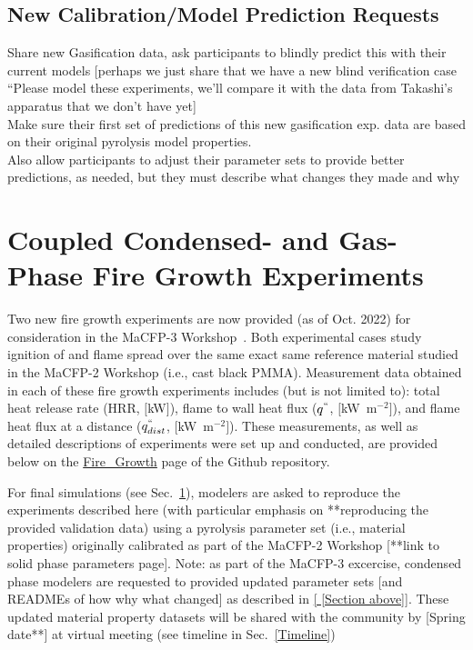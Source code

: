 \documentclass[12pt,demo]{article}
\begin{document}
\subsection{New Calibration/Model Prediction Requests }
Share new Gasification data, ask participants to blindly predict this with their current models [perhaps we just share that we have a new blind verification case “Please model these experiments, we’ll compare it with the data from Takashi’s apparatus that we don’t have yet]\\
Make sure their first set of predictions of this new gasification exp. data are based on their original pyrolysis model properties.\\
Also allow participants to adjust their parameter sets to provide better predictions, as needed, but they must describe what changes they made and why\\

\clearpage
\section{Coupled Condensed- and Gas-Phase Fire Growth Experiments}
Two new fire growth experiments are now provided (as of Oct. 2022) for consideration in the MaCFP-3 Workshop~\cite{chaudhari2021experimental, Leventon2022ParallelPanel}. Both experimental cases study ignition of and flame spread over the same exact same reference material studied in the MaCFP-2 Workshop (i.e., cast black PMMA). Measurement data obtained in each of these fire growth experiments includes (but is not limited to): total heat release rate (HRR, $[$kW$]$), flame to wall heat flux ($q^{``}$, $[$kW~m$^{-2}$$]$), and flame heat flux at a distance ($q^{``}_{dist}$, $[$kW~m$^{-2}$$]$). These measurements, as well as detailed descriptions of experiments were set up and conducted, are provided below on the \href{https://github.com/MaCFP/macfp-db/tree/master/Fire_Growth}{Fire\_Growth} page of the Github repository. 

For final simulations (see Sec.~\ref{}), modelers are asked to reproduce the experiments described here (with particular emphasis on **reproducing the provided validation data) using a pyrolysis parameter set (i.e., material properties) originally calibrated as part of the MaCFP-2 Workshop [**link to solid phase parameters page]. Note: as part of the MaCFP-3 excercise, condensed phase modelers are requested to provided updated parameter sets [and READMEs of how why what changed] as described in \ref{ [Section above]}. These updated material property datasets will be shared with the community by [Spring date**] at virtual meeting (see timeline in Sec.~\ref{Timeline})
\end{document}
